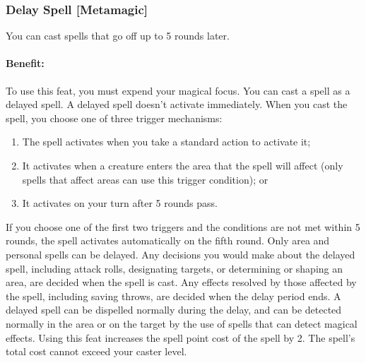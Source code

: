 % 
% 

\subsubsection[Delay Spell]{Delay Spell [Metamagic]}
\label{Feat:DelaySpell}
You can cast spells that go off up to 5 rounds later.

\paragraph{Benefit:} To use this feat, you must expend your magical focus. 
You can cast a spell as a delayed spell. A delayed spell doesn't activate immediately. 
When you cast the spell, you choose one of three trigger mechanisms: 
\begin{enumerate}
 \item The spell activates when you take a standard action to activate it;
 \item It activates when a creature enters the area that the spell will affect (only spells that affect areas can use this trigger condition); or
 \item It activates on your turn after 5 rounds pass.
\end{enumerate}   
If you choose one of the first two triggers and the conditions are not met within 5 rounds, the spell activates automatically on the fifth round.
Only area and personal spells can be delayed.
Any decisions you would make about the delayed spell, including attack rolls, designating targets, or determining or shaping an area, are decided when the spell is cast. 
Any effects resolved by those affected by the spell, including saving throws, are decided when the delay period ends.
A delayed spell can be dispelled normally during the delay, 
and can be detected normally in the area or on the target by the use of spells that can detect magical effects. 
Using this feat increases the spell point cost of the spell by 2. The spell's total cost cannot exceed your caster level.
